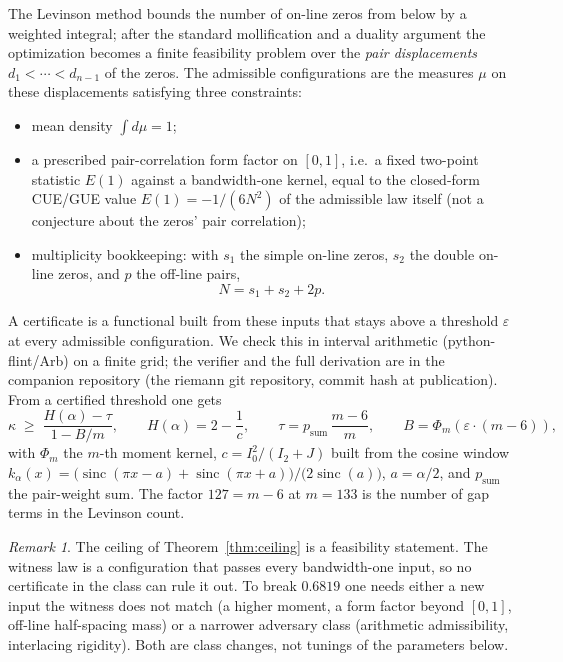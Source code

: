 \documentclass[11pt]{article}
\theoremstyle{remark}
\newtheorem{remark}[theorem]{Remark}
\newcommand{\eps}{\varepsilon}
\begin{document}
The Levinson method bounds the number of on-line zeros from below by a weighted
integral; after the standard mollification and a duality argument the optimization
becomes a finite feasibility problem over the \emph{pair displacements}
$d_1<\cdots<d_{n-1}$ of the zeros. The admissible configurations are the measures
$\mu$ on these displacements satisfying three constraints:

\begin{itemize}
\item mean density $\int d\mu = 1$;
\item a prescribed pair-correlation form factor on $[0,1]$, i.e.\ a fixed two-point
  statistic $E(1)$ against a bandwidth-one kernel, equal to the closed-form
  CUE/GUE value $E(1)=-1/(6N^2)$ of the admissible law itself (not a conjecture
  about the zeros' pair correlation);
\item multiplicity bookkeeping: with $s_1$ the simple on-line zeros, $s_2$ the double
  on-line zeros, and $p$ the off-line pairs,
  \[
    N = s_1 + s_2 + 2p .
  \]
\end{itemize}

A certificate is a functional built from these inputs that stays above a threshold
$\eps$ at every admissible configuration. We check this in interval arithmetic
(python-flint/Arb) on a finite grid; the verifier and the full derivation are in the
companion repository (the riemann git repository, commit hash at publication). From a
certified threshold one gets
\[
  \kappa \;\ge\; \frac{H(\alpha)-\tau}{1 - B/m},
  \qquad
  H(\alpha) = 2-\frac1c,\qquad \tau = p_{\mathrm{sum}}\,\frac{m-6}{m},
  \qquad B = \Phi_m(\eps\cdot (m-6)),
\]
with $\Phi_m$ the $m$-th moment kernel, $c = I_0^2/(I_2+J)$ built from the cosine
window $k_\alpha(x) = \bigl(\operatorname{sinc}(\pi x-a)+\operatorname{sinc}(\pi x+a)\bigr)/\bigl(2\operatorname{sinc}(a)\bigr)$,
$a=\alpha/2$, and $p_{\mathrm{sum}}$ the pair-weight sum. The factor $127=m-6$ at
$m=133$ is the number of gap terms in the Levinson count.

\begin{remark}
The ceiling of Theorem~\ref{thm:ceiling} is a feasibility statement. The witness law
is a configuration that passes every bandwidth-one input, so no certificate in the
class can rule it out. To break $0.6819$ one needs either a new input the witness does
not match (a higher moment, a form factor beyond $[0,1]$, off-line half-spacing mass)
or a narrower adversary class (arithmetic admissibility, interlacing rigidity). Both
are class changes, not tunings of the parameters below.
\end{remark}
\end{document}
